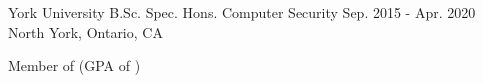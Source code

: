 

\begin{cventries}

  \cventry
    {York University} %
    {B.Sc. Spec. Hons. Computer Security} %
    {Sep. 2015 - Apr. 2020} %
    {North York, Ontario, CA} %
    {
      \begin{cvitems} %
        \item {Member of  (GPA of )}
        \item {}
      \end{cvitems} 
    }

\end{cventries}

